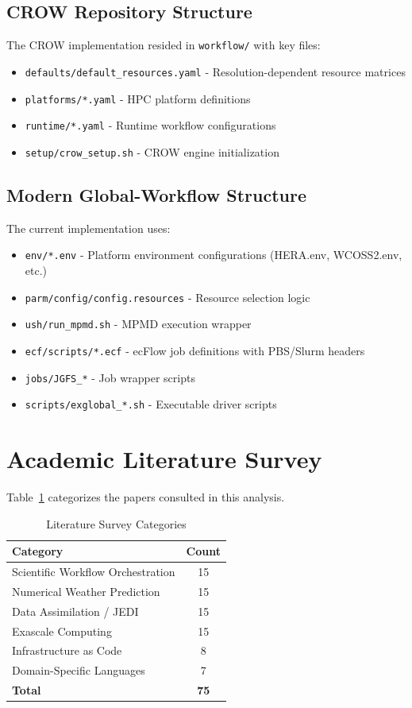 \documentclass[11pt,twocolumn]{article}
\begin{document}
\subsection{CROW Repository Structure}
The CROW implementation resided in \texttt{workflow/} with key files:
\begin{itemize}
    \item \texttt{defaults/default\_resources.yaml} - Resolution-dependent resource matrices
    \item \texttt{platforms/*.yaml} - HPC platform definitions
    \item \texttt{runtime/*.yaml} - Runtime workflow configurations
    \item \texttt{setup/crow\_setup.sh} - CROW engine initialization
\end{itemize}

\subsection{Modern Global-Workflow Structure}
The current implementation uses:
\begin{itemize}
    \item \texttt{env/*.env} - Platform environment configurations (HERA.env, WCOSS2.env, etc.)
    \item \texttt{parm/config/config.resources} - Resource selection logic
    \item \texttt{ush/run\_mpmd.sh} - MPMD execution wrapper
    \item \texttt{ecf/scripts/*.ecf} - ecFlow job definitions with PBS/Slurm headers
    \item \texttt{jobs/JGFS\_*} - Job wrapper scripts
    \item \texttt{scripts/exglobal\_*.sh} - Executable driver scripts
\end{itemize}

\section{Academic Literature Survey}

Table~\ref{tab:literature} categorizes the papers consulted in this analysis.

\begin{table}[H]
\centering
\caption{Literature Survey Categories}
\label{tab:literature}
\begin{tabular}{@{}lc@{}}
\toprule
\textbf{Category} & \textbf{Count} \\
\midrule
Scientific Workflow Orchestration & 15 \\
Numerical Weather Prediction & 15 \\
Data Assimilation / JEDI & 15 \\
Exascale Computing & 15 \\
Infrastructure as Code & 8 \\
Domain-Specific Languages & 7 \\
\midrule
\textbf{Total} & \textbf{75} \\
\bottomrule
\end{tabular}
\end{table}
\end{document}
